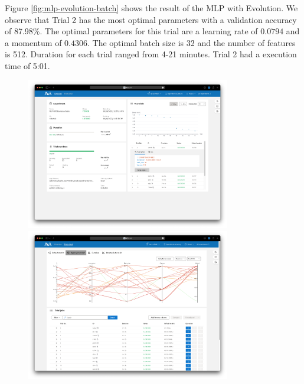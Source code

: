 \documentclass{article}
\begin{document}
Figure \ref{fig:mlp-evolution-batch} shows the result of the MLP with Evolution. We observe that Trial 2 has the most optimal parameters with a validation accuracy of 87.98\%. The optimal parameters for this trial are a learning rate of $0.0794$ and a momentum of $0.4306$. The optimal batch size is 32 and the number of features is 512. Duration for each trial ranged from 4-21 minutes. Trial 2 had a execution time of 5:01.

\begin{figure}
    \centerline{\includegraphics[width=3.5in]{../proj3/figures/mlp_evolution_batch_overview.png}\includegraphics[width=3.5in]{../proj3/figures/mlp_evolution_batch_hyperparameter.png}}

\end{figure}
\end{document}
